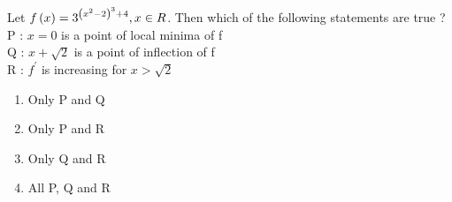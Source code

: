 \item Let $f\left(x\right) = 3^{\left(x^2 - 2\right)^3+4}, x \in R$. Then which of the following statements are true ?\\
P : $x = 0$ is a point of local minima of f\\
Q : $x +\sqrt{2}$ is a point of inflection of f\\
R : $f^{\prime}$ is increasing for $x > \sqrt{2}$
\hfill{}
\begin{enumerate}
    \item Only P and Q
    \item Only P and R
    \item Only Q and R
    \item All P, Q and R
\end{enumerate}
